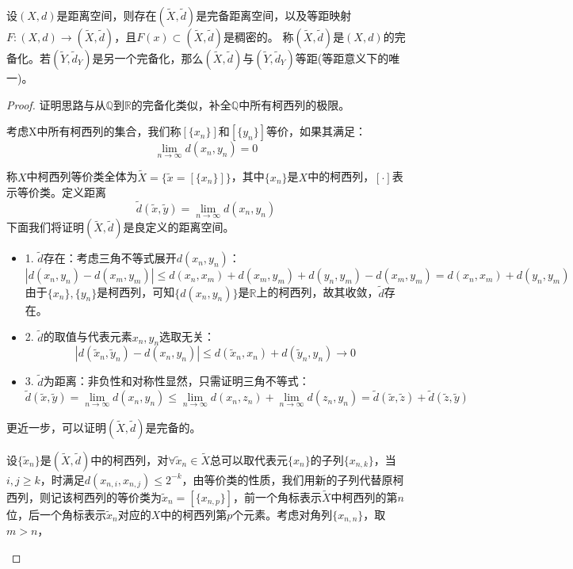 \begin{theorem}[完备化定理]
    设$(X,d)$是距离空间，则存在$(\tilde{X},\tilde{d})$是完备距离空间，以及等距映射$F:(X,d) \rightarrow (\tilde{X},\tilde{d})$，且$F(x) \subset (\tilde{X},\tilde{d})$是稠密的。
    称$(\tilde{X},\tilde{d})$是$(X,d)$的完备化。若$(\tilde{Y},\tilde{d}_Y)$是另一个完备化，那么$(\tilde{X},\tilde{d})$与$(\tilde{Y},\tilde{d}_Y)$等距(等距意义下的唯一)。
\end{theorem}
\begin{proof}证明思路与从$\mathbb{Q}$到$\mathbb{R}$的完备化类似，补全$\mathbb{Q}$中所有柯西列的极限。
\begin{definition}[等价类]
考虑X中所有柯西列的集合，我们称$[\{x_n\}]$和$[\{y_n\}]$等价，如果其满足：
\[\lim_{n \to \infty}d(x_n,y_n)=0\]
\end{definition}
称$X$中柯西列等价类全体为$\tilde{X}=\{\tilde{x}=[\{x_n\}]\}$，其中$\{x_n\}$是$X$中的柯西列，$[\cdot]$表示等价类。定义距离
\[\tilde{d}(\tilde{x},\tilde{y})=\lim_{n \to \infty}d(x_n,y_n)\]
下面我们将证明$(\tilde{X},\tilde{d})$是良定义的距离空间。
\begin{proposition}
\begin{itemize}
\item 1. $\tilde{d}$存在：考虑三角不等式展开$d(x_n,y_n)$：
\[|d(x_n,y_n)-d(x_m,y_m)| \leq d(x_n,x_m)+d(x_m,y_m)+d(y_n,y_m)-d(x_m,y_m)=d(x_n,x_m)+d(y_n,y_m)\]
由于$\{x_n\},\{y_n\}$是柯西列，可知$\{d(x_n,y_n)\}$是$\mathbb{R}$上的柯西列，故其收敛，$\tilde{d}$存在。
\item 2. $\tilde{d}$的取值与代表元素$x_n,y_n$选取无关：
\[|d(\tilde{x}_n,\tilde{y}_n)-d(x_n,y_n)| \leq d(\tilde{x}_n,x_n)+d(\tilde{y}_n,y_n)\to 0\]
\item 3. $\tilde{d}$为距离：非负性和对称性显然，只需证明三角不等式：
\[\tilde{d}(\tilde{x},\tilde{y})=\lim_{n \to \infty}d(x_n,y_n) \leq \lim_{n \to \infty}d(x_n,z_n)+\lim_{n \to \infty}d(z_n,y_n)=\tilde{d}(\tilde{x},\tilde{z})+\tilde{d}(\tilde{z},\tilde{y})\]
\end{itemize}
\end{proposition}
更近一步，可以证明$(\tilde{X},\tilde{d})$是完备的。
\begin{proposition}
设$\{\tilde{x}_n\}$是$(\tilde{X},\tilde{d})$中的柯西列，对$\forall \tilde{x}_n \in \tilde{X}$总可以取代表元$\{x_n\}$的子列$\{x_{n,k}\}$，当$i,j \geq k$，时满足$d(x_{n,i},x_{n,j})\leq 2^{-k}$，由等价类的性质，我们用新的子列代替原柯西列，则记该柯西列的等价类为$\tilde{x}_n=[\{x_{n,p}\}]$，前一个角标表示$\tilde{X}$中柯西列的第$n$位，后一个角标表示$\tilde{x}_n$对应的$X$中的柯西列第$p$个元素。考虑对角列$\{x_{n,n}\}$，取$m>n$，

\end{proposition}
\end{proof}
